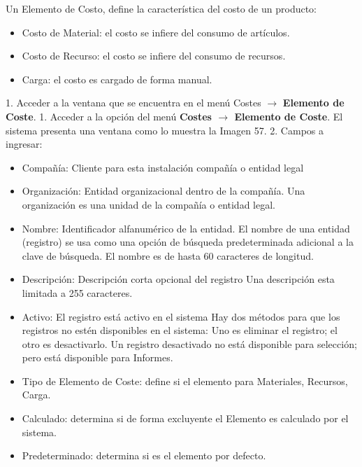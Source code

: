 \documentclass[letterpaper,10pt,spanish]{sphinxmanual}
\begin{document}
Un Elemento de Costo, define la característica del costo de un producto:
\begin{itemize}
\item {} 
Costo de Material: el costo se infiere del consumo de artículos.

\item {} 
Costo de Recurso: el costo se infiere del consumo de recursos.

\item {} 
Carga: el costo es cargado de forma manual.

\end{itemize}

1. Acceder a la ventana que se encuentra en el menú Costes \(\rightarrow\) \textbf{Elemento de Coste}.
1. Acceder a la opción del menú \textbf{Costes \(\rightarrow\) Elemento de Coste}. El sistema presenta una ventana como lo muestra la Imagen 57.
2. Campos a ingresar:
\begin{itemize}
\item {} 
Compañía: Cliente para esta instalación compañía o entidad legal

\item {} 
Organización: Entidad organizacional dentro de la compañía. Una organización es una unidad de la compañía o entidad legal.

\item {} 
Nombre: Identificador alfanumérico de la entidad. El nombre de una entidad (registro) se usa como una opción de búsqueda predeterminada adicional a la clave de búsqueda. El nombre es de hasta 60 caracteres de longitud.

\item {} 
Descripción: Descripción corta opcional del registro Una descripción esta limitada a 255 caracteres.

\item {} 
Activo: El registro está activo en el sistema Hay dos métodos para que los registros no estén disponibles en el sistema: Uno es eliminar el registro; el otro es desactivarlo. Un registro desactivado no está disponible para selección; pero está disponible para Informes.

\item {} 
Tipo de Elemento de Coste: define si el elemento para Materiales, Recursos, Carga.

\item {} 
Calculado: determina si de forma excluyente el Elemento es calculado por el sistema.

\item {} 
Predeterminado: determina si es el elemento por defecto.

\end{itemize}
\end{document}
